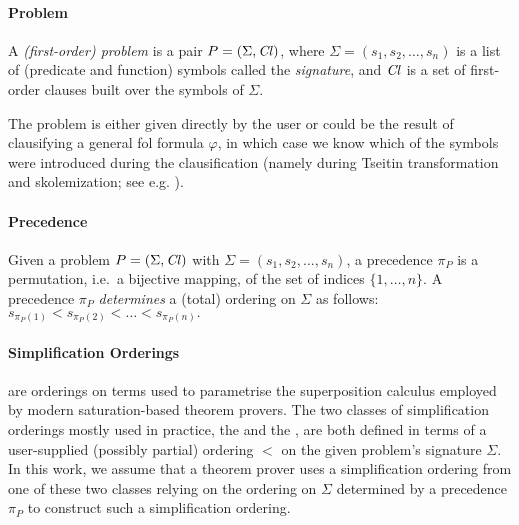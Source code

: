 
\paragraph{Problem}
A \emph{(first-order) problem} is a pair \(P = (\Sigma, \operatorname{\mathit{Cl}})\),
where \(\Sigma = (s_1, s_2, \ldots, s_n)\) is a list of (predicate and function) symbols called the \emph{signature},
and \(\operatorname{\mathit{Cl}}\) is a set of first-order
clauses built over the symbols of \(\Sigma\).

The problem is either given directly by the user or 
could be the result of clausifying a general \gls{fol} formula \(\varphi\),
in which case we know which of the symbols were introduced during the clausification
(namely during Tseitin transformation and skolemization; see e.g. \cite{DBLP:books/el/RV01/NonnengartW01}).

\paragraph{Precedence}
Given a problem \(P = (\Sigma, \operatorname{\mathit{Cl}})\) with \(\Sigma = (s_1, s_2, \ldots, s_n)\),
a precedence \(\pi_P\) is a permutation, i.e.~a bijective mapping, of the set of indices \(\{1,\ldots,n\}\).
A precedence \(\pi_P\) \emph{determines} a (total) ordering on \(\Sigma\) as follows:
\(s_{\pi_P(1)} < s_{\pi_P(2)} < \ldots < s_{\pi_P(n)}.\)

\paragraph{Simplification Orderings} are orderings on terms used to parametrise the superposition calculus \cite{Nieuwenhuis2001}
employed by modern saturation-based theorem provers. The two classes of simplification orderings mostly used in practice,
the  \cite{Knuth1983} and the  \cite{Kamin1980}, are both defined in terms 
of a user-supplied (possibly partial) ordering $<$ %
on the given problem's signature \(\Sigma\).
In this work, we assume that a theorem prover uses a simplification ordering from one of these two classes
relying on the ordering on \(\Sigma\) determined by a precedence \(\pi_P\) to construct such a simplification ordering.

